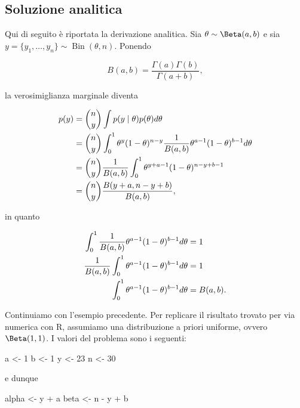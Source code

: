 \documentclass[
]{memoir}
\newenvironment{Shaded}{\begin{snugshade}}{\end{snugshade}}
\newcommand{\DecValTok}[1]{\textcolor[rgb]{0.00,0.00,0.81}{#1}}
\newcommand{\NormalTok}[1]{#1}
\newcommand{\OtherTok}[1]{\textcolor[rgb]{0.56,0.35,0.01}{#1}}
\newcommand{\SpecialCharTok}[1]{\textcolor[rgb]{0.00,0.00,0.00}{#1}}
\DeclareMathOperator{\Bin}{Bin} %
\theoremstyle{definition}
\theoremstyle{definition}
\theoremstyle{definition}
\theoremstyle{definition}
\theoremstyle{remark}
\begin{document}
\hypertarget{soluzione-analitica}{%
\subsection{Soluzione analitica}\label{soluzione-analitica}}

Qui di seguito è riportata la derivazione analitica. Sia \(\theta \sim \Beta(a, b)\) e sia \(y = \{y_1, \dots, y_n\} \sim \Bin(\theta, n)\). Ponendo

\[
B(a, b) = \frac{\Gamma(a)\Gamma(b)}{\Gamma(a+b)},
\]

\noindent
la verosimiglianza marginale diventa

\begin{align}
p(y) &= \binom{n}{y} \int p(y \mid \theta) p(\theta) d\theta \notag\\
&= \binom{n}{y}\int_0^1 \theta^{y} (1 - \theta)^{n- y} \frac{1}{B(a,b)} \theta^{a-1} (1-\theta)^{b-1} d \theta \notag\\
&= \binom{n}{y}\frac{1}{B(a,b)} \int_0^1 \theta^{y + a - 1} (1-\theta)^{n- y + b-1} \notag\\
&= \binom{n}{y}\frac{B(y + a, n- y + b)}{B(a,b)},
\end{align}

\noindent
in quanto

\begin{align}
\int_0^1 \frac{1}{B(a,b)} \theta^{a-1} (1-\theta)^{b-1} d \theta &= 1\notag\\
\frac{1}{B(a,b)} \int_0^1  \theta^{a-1} (1-\theta)^{b-1} d \theta &= 1\notag\\
\int_0^1  \theta^{a-1} (1-\theta)^{b-1} d \theta &= B(a,b). \notag
\end{align}

\noindent
Continuiamo con l'esempio precedente. Per replicare il risultato trovato per via numerica con R, assumiamo una distribuzione a priori uniforme, ovvero \(\Beta(1, 1)\). I valori del problema sono i seguenti:

\begin{Shaded}
\begin{Highlighting}[]
\NormalTok{a }\OtherTok{\textless{}{-}} \DecValTok{1}
\NormalTok{b }\OtherTok{\textless{}{-}} \DecValTok{1}
\NormalTok{y }\OtherTok{\textless{}{-}} \DecValTok{23}
\NormalTok{n }\OtherTok{\textless{}{-}} \DecValTok{30}
\end{Highlighting}
\end{Shaded}

\noindent
e dunque

\begin{Shaded}
\begin{Highlighting}[]
\NormalTok{alpha }\OtherTok{\textless{}{-}}\NormalTok{ y }\SpecialCharTok{+}\NormalTok{ a}
\NormalTok{beta }\OtherTok{\textless{}{-}}\NormalTok{ n }\SpecialCharTok{{-}}\NormalTok{ y }\SpecialCharTok{+}\NormalTok{ b}
\end{Highlighting}
\end{Shaded}
\end{document}
